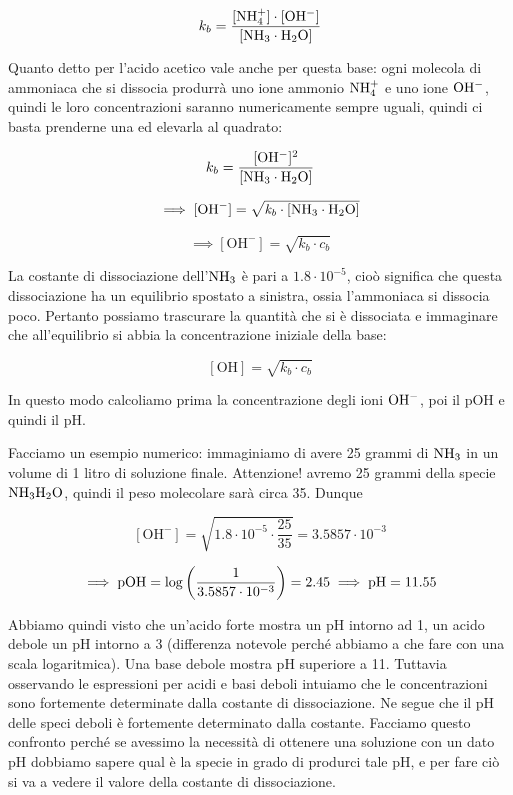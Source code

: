 $$k_b= \frac{\rm{[NH_4^+] \cdot [OH^-]}}{\rm{[NH_3 \cdot H_2O]}}$$

Quanto detto per l'acido acetico vale anche per questa base: ogni molecola di ammoniaca che si dissocia produrrà uno ione ammonio $\rm NH_4^+$ e uno ione $\rm OH^-$, quindi le loro concentrazioni saranno numericamente sempre uguali, quindi ci basta prenderne una ed elevarla al quadrato:

$$k_b= \frac{\rm{[OH^-]^2}}{\rm{[NH_3 \cdot H_2O]}}$$

$$\implies \rm [OH^-] = \sqrt{ \textit{k}_{\textit{b}} \cdot [NH_3 \cdot H_2O]}$$

$$\implies  [\text{OH}^-] = \sqrt{ k_b \cdot c_b}$$

La costante di dissociazione dell'$\rm NH_3$ è pari a $1.8 \cdot 10^{-5}$, cioò significa che questa dissociazione ha un equilibrio spostato a sinistra, ossia l'ammoniaca si dissocia poco. Pertanto possiamo trascurare la quantità che si è dissociata e immaginare che all'equilibrio si abbia la concentrazione iniziale della base:

$$[\text{OH}]=\sqrt{k_b \cdot c_b}$$

In questo modo calcoliamo prima la concentrazione degli ioni $\rm OH^-$, poi il pOH e quindi il pH.

\vspace{0.2cm}Facciamo un esempio numerico: immaginiamo di avere 25 grammi di $\rm NH_3$ in un volume di 1 litro di soluzione finale. Attenzione! avremo 25 grammi della specie $\rm NH_3H_2O$, quindi il peso molecolare sarà circa 35. Dunque

$$[\text{OH}^-]=\sqrt{1.8 \cdot 10^{-5} \cdot \frac{25}{35}}=3.5857 \cdot 10^{-3}$$

$$\implies \rm pOH= \log \left( \frac{1}{3.5857 \cdot 10^{-3}} \right)=2.45 \implies pH=11.55$$

Abbiamo quindi visto che un'acido forte mostra un pH intorno ad 1, un acido debole un pH intorno a 3 (differenza notevole perché abbiamo a che fare con una scala logaritmica). Una base debole mostra pH superiore a 11. Tuttavia osservando le espressioni per acidi e basi deboli intuiamo che le concentrazioni sono fortemente determinate dalla costante di dissociazione. Ne segue che il pH delle speci deboli è fortemente determinato dalla costante. Facciamo questo confronto perché se avessimo la necessità di ottenere una soluzione con un dato pH dobbiamo sapere qual è la specie in grado di produrci tale pH, e per fare ciò si va a vedere il valore della costante di dissociazione.

